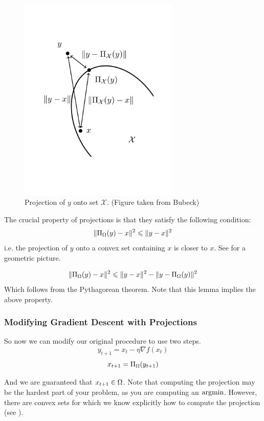 \begin{figure}
\begin{center}
\includegraphics[width=3in]{figures/lecture2-projection}
\end{center}
\caption{Projection of $y$ onto set $\mathcal{X}$. (Figure taken from Bubeck) }
\end{figure}

The crucial property of projections is that they satisfy the following condition:
\[
\| \Pi_{\Omega}(y) - x \|^2 \leqslant \| y - x \|^2
\]
i.e. the projection of $y$ onto a convex set containing $x$ is closer to $x$. See  for a geometric picture.

\begin{lemma}
\[
\| \Pi_{\Omega}(y) - x \|^2 \leqslant \| y - x \|^2 - \| y - \Pi_{\Omega}(y) \|^2
\]
Which follows from the Pythagorean theorem. Note that this lemma implies the above property.
\end{lemma}

\subsubsection{Modifying Gradient Descent with Projections}

So now we can modify our original procedure to use two steps.
\[
y_{t+1} = x_t - \eta \nabla f(x_t)
\]
\[
x_{t+1} = \Pi_{\Omega}(y_{t+1})
\]

And we are guaranteed that $x_{t+1}\in\Omega$. Note that computing the
projection may be the hardest part of your problem, as you are computing an
$\operatorname*{\arg\!\min}$. However, there are convex sets for which we know explicitly how to
compute the projection (see ).

